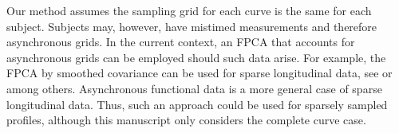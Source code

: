 \documentclass[12pt]{article}
\theoremstyle{plain}
\theoremstyle{remark}
\begin{document}
	Our method assumes the sampling grid for each curve is the same for each subject. Subjects may, however, have mistimed measurements and therefore asynchronous grids. In the current context, an FPCA that accounts for asynchronous grids can be employed should such data arise. For example, the FPCA by smoothed covariance can be used for sparse longitudinal data, see \cite{Yao2005} or \cite{Di2009} among others. Asynchronous functional data is a more general case of sparse longitudinal data. Thus, such an approach could be used for sparsely sampled profiles, although this manuscript only considers the complete curve case.
	
	
\end{document}
